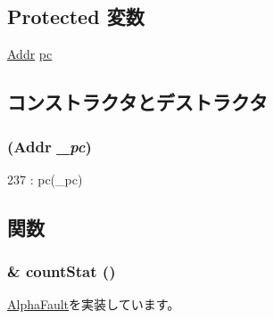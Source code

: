 \subsection*{Protected 変数}
\begin{DoxyCompactItemize}
\item 
\hyperlink{classm5_1_1params_1_1Addr}{Addr} \hyperlink{classAlphaISA_1_1ItbFault_afed6bf9f08aaa7445161a391a719b7e4}{pc}
\end{DoxyCompactItemize}


\subsection{コンストラクタとデストラクタ}
\hypertarget{classAlphaISA_1_1ItbFault_a03effcae3578d6a5662047858f7c2c86}{
\subsubsection[{ItbFault}]{ ({\bf Addr} {\em \_\-pc})}}
\label{classAlphaISA_1_1ItbFault_a03effcae3578d6a5662047858f7c2c86}



\begin{DoxyCode}
237 : pc(_pc) { }
\end{DoxyCode}


\subsection{関数}
\hypertarget{classAlphaISA_1_1ItbFault_a4b643982263b390349238a6711216763}{
\subsubsection[{countStat}]{\& countStat ()}}
\label{classAlphaISA_1_1ItbFault_a4b643982263b390349238a6711216763}


\hyperlink{classAlphaISA_1_1AlphaFault_a5d92ccd11b5cd6b04f02bd0a088b776c}{AlphaFault}を実装しています。

